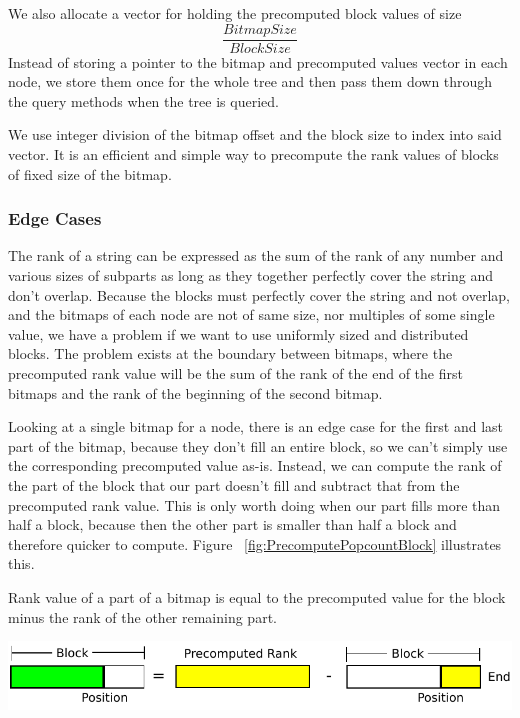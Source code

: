 We also allocate a vector for holding the precomputed block values of size
\[ \frac{BitmapSize}{BlockSize} \]
Instead of storing a pointer to the bitmap and precomputed values vector in each node, we store them once for the whole tree and then pass them down through the query methods when the tree is queried.

We use integer division of the bitmap offset and the block size to index into said vector. It is an efficient and simple way to precompute the rank values of blocks of fixed size of the bitmap.


\subsubsection{Edge Cases}
\label{sec:rankQueriesWithPrecomputedRanksEdgeCases}
The rank of a string can be expressed as the sum of the rank of any number and various sizes of subparts as long as they together perfectly cover the string and don't overlap.
Because the blocks must perfectly cover the string and not overlap, and the bitmaps of each node are not of same size, nor multiples of some single value, we have a problem if we want to use uniformly sized and distributed blocks.
The problem exists at the boundary between bitmaps, where the precomputed rank value will be the sum of the rank of the end of the first bitmaps and the rank of the beginning of the second bitmap.

Looking at a single bitmap for a node, there is an edge case for the first and last part of the bitmap, because they don't fill an entire block, so we can't simply use the corresponding precomputed value as-is.
Instead, we can compute the rank of the part of the block that our part doesn't fill and subtract that from the precomputed rank value.
This is only worth doing when our part fills more than half a block, because then the other part is smaller than half a block and therefore quicker to compute.
Figure ~\ref{fig:PrecomputePopcountBlock} illustrates this.



\figureBegin
\caption{Rank value of a part of a bitmap is equal to the precomputed value for the block minus the rank of the other remaining part.}
\label{fig:PrecomputePopcountBlock}
\includegraphics[width=\textwidth]{PrecomputePopcountBlock.pdf}
\figureEnd




